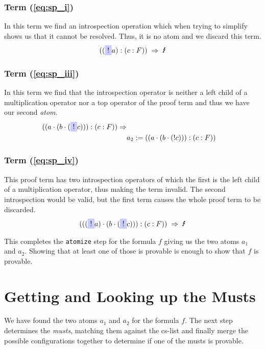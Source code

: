 \subsubsection[Second term]{Term (\ref{eq:sp_i})}
In this term we find an introspection operation which when trying to simplify shows us that it cannot be resolved. Thus, it is no atom and we discard this term.
\begin{equation*}
	((\tikz[baseline]{\node[fill=blue!20,anchor=base] (t1){$!$};}a):(c:F))\; \Rightarrow \; \text{\Lightning} 
\end{equation*}


\subsubsection[Third term]{Term (\ref{eq:sp_iii})}
In this term we find that the introspection operator is neither a left child of a multiplication operator nor a top operator of the proof term and thus we have our second \emph{atom}.
\begin{equation}\label{eq:a_2}
	\begin{split}
	((a \cdot(b\cdot (\tikz[baseline]{\node[fill=blue!20,anchor=base] (t1){$!$};} c))):(c:F)) \Rightarrow \\
	& a_2 := ((a \cdot(b\cdot (! c))):(c:F))
	\end{split}
\end{equation}


\subsubsection[Fourth term]{Term (\ref{eq:sp_iv})}
This proof term has two introspection operators of which the first is the left child of a multiplication operator, thus making the term invalid. The second introspection would be valid, but the first term causes the whole proof term to be discarded.
\begin{equation*}
	(((
	\tikz[baseline]{\node[fill=blue!20,anchor=base] (t1){$!$};} a)\cdot(b\cdot (
	\tikz[baseline]{\node[fill=blue!20,anchor=base] (t1){$!$};} c))):(c:F)) \; \Rightarrow \; \text{\Lightning} 
\end{equation*}


\bigskip
This completes the \texttt{atomize} step for the formula $f$ giving us the two atoms $a_1$ and $a_2$. Showing that at least one of those is provable is enough to show that $f$ is provable. 

\section{Getting and Looking up the Musts}
We have found the two atoms $a_1$ and $a_2$ for the formula $f$. The next step determines the \emph{musts}, matching them against the cs-list and finally merge the possible configurations together to determine if one of the musts is provable.

